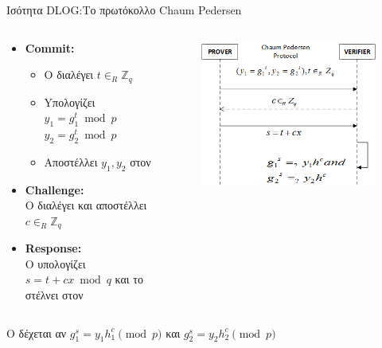 \documentclass[handout]{beamer}
\begin{document}
\begin{frame}[allowframebreaks]{Ισότητα DLOG:Το πρωτόκολλο Chaum Pedersen}
\begin{columns}
\begin{small}
\begin{itemize}
\item  \textbf{Commit:}
\begin{itemize}
\item Ο \prv  διαλέγει $t \in_R \mathbb{Z}_q$
\item Yπολογίζει $y_1 = g_{1}^{t} \bmod{p}$\\ $y_2 = g_{2}^{t} \bmod{p}$
\item Αποστέλλει $y_1, y_2$  στον \ver 
\end{itemize}
\item  \textbf{Challenge:}\\  
Ο \ver διαλέγει και αποστέλλει $c \in_R \mathbb{Z}_q$ 
\item  \textbf{Response:}\\   
Ο \prv υπολογίζει $s = t+cx \bmod{q}$ και το στέλνει στον \ver
\end{itemize} 
\end{small}
\begin{figure}
\includegraphics[width=1\textwidth]{chaumpedersen.png} 
\end{figure}
\end{columns}

\begin{center}
Ο \ver δέχεται αν  $g^s_1 = y_1h_{1}^c \pmod{p}$ και  $g^s_2 = y_2h_{2}^c \pmod{p}$ 
\end{center}


\end{frame}
\end{document}
